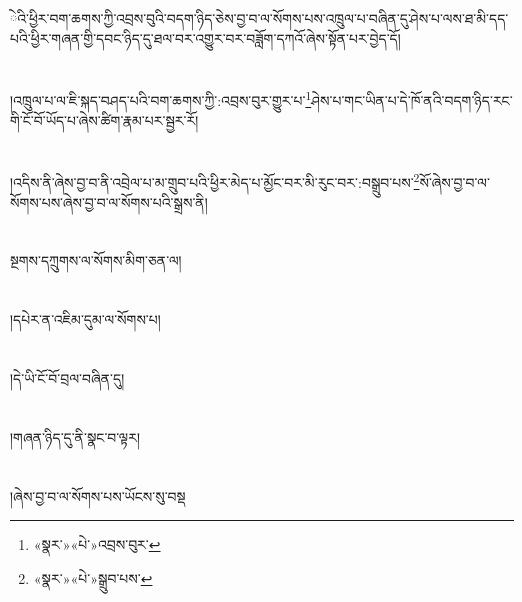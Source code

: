 ེའི་ཕྱིར་བག་ཆགས་ཀྱི་འབྲས་བུའི་བདག་ཉིད་ཅེས་བྱ་བ་ལ་སོགས་པས་འཁྲུལ་པ་བཞིན་དུ་ཤེས་པ་ལས་ཐ་མི་དད་པའི་ཕྱིར་གཞན་གྱི་དབང་ཉིད་དུ་ཐལ་བར་འགྱུར་བར་བཟློག་དཀའོ་ཞེས་སྟོན་པར་བྱེད་དོ།\chapter{ }།འཁྲུལ་པ་ལ་ཇི་སྐད་བཤད་པའི་བག་ཆགས་ཀྱི་:འབྲས་བུར་གྱུར་པ་\footnote{«སྣར་»«པེ་»འབྲས་བུར་}ཤེས་པ་གང་ཡིན་པ་དེ་ཁོ་ནའི་བདག་ཉིད་རང་གི་ངོ་བོ་ཡོད་པ་ཞེས་ཚིག་རྣམ་པར་སྦྱར་རོ།\chapter{ }།འདིས་ནི་ཞེས་བྱ་བ་ནི་འབྲེལ་པ་མ་གྲུབ་པའི་ཕྱིར་མེད་པ་མྱོང་བར་མི་རུང་བར་:བསྒྲུབ་པས་\footnote{«སྣར་»«པེ་»སྒྲུབ་པས་}སོ་ཞེས་བྱ་བ་ལ་སོགས་པས་ཞེས་བྱ་བ་ལ་སོགས་པའི་སྒྲས་ནི།\chapter{ }སྔགས་དཀྲུགས་ལ་སོགས་མིག་ཅན་ལ།\chapter{ }།དཔེར་ན་འཇིམ་དུམ་ལ་སོགས་པ།\chapter{ }།དེ་ཡི་ངོ་བོ་བྲལ་བཞིན་དུ།\chapter{ }།གཞན་ཉིད་དུ་ནི་སྣང་བ་ལྟར།\chapter{ }།ཞེས་བྱ་བ་ལ་སོགས་པས་ཡོངས་སུ་བསྡ